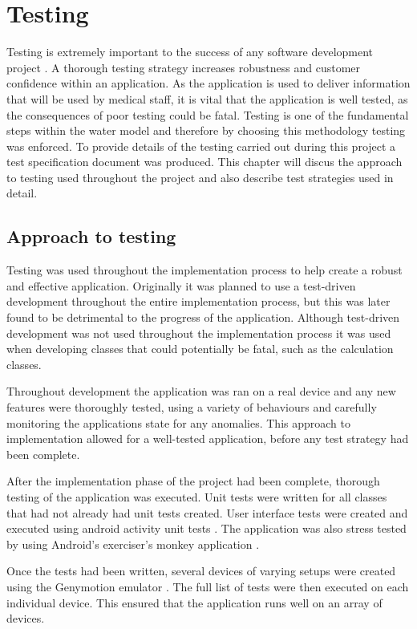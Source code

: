 \chapter{Testing}
Testing is extremely important to the success of any software development project \cite{tdd}. A thorough testing strategy increases robustness and customer confidence within an application. As the application is used to deliver information that will be used by medical staff, it is vital that the application is well tested, as the consequences of poor testing could be fatal. Testing is one of the fundamental steps within the water model \cite{waterfall} and therefore by choosing this methodology testing was enforced. To provide details of the testing carried out during this project a test specification document was produced. This chapter will discus the approach to testing used throughout the project and also describe test strategies used in detail.

\section{Approach to testing}

Testing was used throughout the implementation process to help create a robust and effective application. Originally it was planned to use a test-driven development \cite{tdd} throughout the entire implementation process, but this was later found to be detrimental to the progress of the application.  Although test-driven development was not used throughout the implementation process it was used when developing classes that could potentially be fatal, such as the calculation classes. 

Throughout development the application was ran on a real device and any new features were thoroughly tested, using a variety of behaviours and carefully monitoring the applications state for any anomalies. This approach to implementation allowed for a well-tested application, before any test strategy had been complete.

After the implementation phase of the project had been complete, thorough testing of the application was executed. Unit tests \cite{junit} were written for all classes that had not already had unit tests created. User interface tests were created and executed using android activity unit tests \cite{activity_test}. The application was also stress tested by using Android's exerciser's monkey application \cite{exciser}.

Once the tests had been written, several devices of varying setups were created using the Genymotion emulator \cite{genymotion}. The full list of tests were then executed on each individual device. This ensured that the application runs well on an array of devices.


